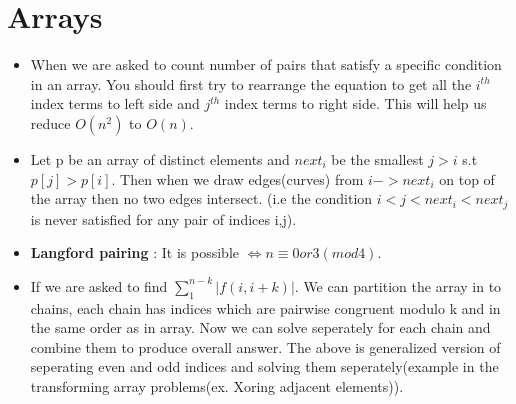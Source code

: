 \documentclass[../Notes.tex]{subfiles}
\begin{document}
\chapter{Arrays}
\begin{itemize}
	\item When we are asked to count number of pairs that satisfy a specific condition in an array. You should first try to rearrange the equation to get all the $i^{th}$ index terms to left side and $j^{th}$ index terms to right side. This will help us reduce $O(n^2)$ to $O(n)$.
	\item Let p be an array of distinct elements and $next_{i}$ be the smallest $j>i$ s.t $p[j]>p[i]$. Then when we draw edges(curves) from $i -> next_{i}$ on top of the array then no two edges intersect. (i.e the condition $i<j<next_{i}<next_{j}$ is never satisfied for any pair of indices i,j).
	\item \textbf{Langford pairing} : It is possible $\iff n\equiv 0 or 3(mod 4)$.
	\item If we are asked to find $\sum_{1}^{n-k}|f(i,i+k)|$. We can partition the array in to chains, each chain has indices which are pairwise congruent modulo k and in the same order as in array. Now we can solve seperately for each chain and combine them to produce overall answer. The above is generalized version of seperating even and odd indices and solving them seperately(example in the transforming array problems(ex. Xoring adjacent elements)).
\end{itemize}
\end{document}
